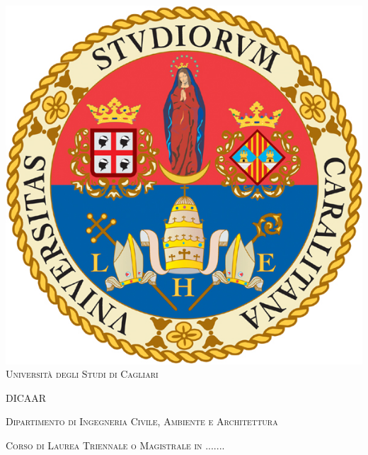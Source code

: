 \begin{titlepage}
	\begin{center}
		
		\includegraphics[scale=.45]{./title/logo_CA.jpg}
		\\
		\vspace{1cm}
		\textsc{\large Università degli Studi di Cagliari}
		\vspace{1.2cm}
		
		\textsc{\Large DICAAR}
		\vspace{0.5cm}
		
		\textsc{\large Dipartimento di Ingegneria Civile, Ambiente e Architettura}
		\vspace{1.0cm}
		
		\textsc{\large Corso di Laurea {Triennale o Magistrale} in .......}\hspace{0.8cm}
		
		\vspace{0.8cm}
		

\end{center}
\end{titlepage}
